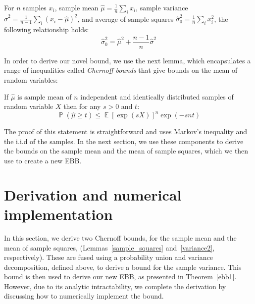 \documentclass[runningheads, envcountsame, a4paper]{llncs}
\DeclareMathOperator{\E}{\mathbb{E}}
\DeclareMathOperator{\p}{\mathbb{P}}
\begin{document}
\begin{lemma}\label{variance1}
For $n$ samples $x_i$, sample mean $\hat{\mu} = \frac{1}{n}\sum_ix_i$, sample variance $\hat{\sigma}^2=\frac{1}{n-1}\sum_i(x_i-\hat{\mu})^2$, and average of sample squares $\hat{\sigma}_0^2 = \frac{1}{n}\sum_ix_i^2$, the following relationship holds:
\[ 
\hat{\sigma}_0^2=\hat{\mu}^2+\frac{n-1}{n}\hat{\sigma}^2
\]
\end{lemma}



In order to derive our novel bound, we use the next lemma, which encapsulates a range of inequalities called \textit{Chernoff bounds} that give bounds on the mean of random variables:

\begin{lemma}\label{chernoff1}
If $\hat{\mu}$ is sample mean of $n$ independent and identically distributed samples of random variable $X$ then for any $s>0$ and $t$:
\[ \p(\hat{\mu}\ge t)\le\E\left[\exp(sX)\right]^n\exp(-snt) \]
\end{lemma}

The proof of this statement is straightforward and uses Markov's inequality and the i.i.d of the samples.
In the next section, we use these components to derive the bounds on the sample mean and the mean of sample squares, 
which we then use to create a new EBB.


\section{Derivation and numerical implementation}
\label{derivation}
In this section, we derive two Chernoff bounds, 
for the sample mean and the mean of sample squares, (Lemmas~\ref{sample_squares} and~\ref{variance2}, respectively). 
These are fused using a probability union and variance decomposition, defined above, to derive a bound for the sample variance. 
This bound is then used to derive our new EBB, as presented in Theorem~\ref{ebb1}.
However, due to its analytic intractability, we complete the derivation by discussing how to numerically implement the bound.
\end{document}
